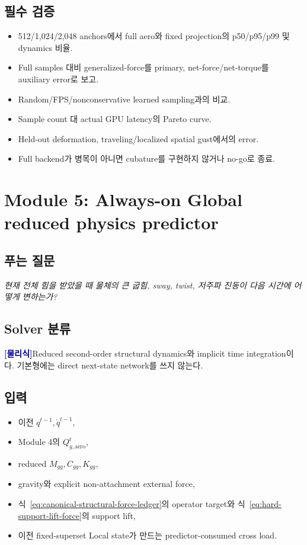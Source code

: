 \documentclass[11pt,a4paper]{article}
\newcommand{\physics}{\textcolor{darkblue}{\textbf{[물리식]}}}
\begin{document}
\subsection*{필수 검증}

\begin{itemize}[leftmargin=1.5em]
  \item 512/1,024/2,048 anchors에서 full aero와 fixed projection의 p50/p95/p99 및 dynamics 비율.
  \item Full samples 대비 generalized-force를 primary, net-force/net-torque를 auxiliary error로 보고.
  \item Random/FPS/nonconservative learned sampling과의 비교.
  \item Sample count 대 actual GPU latency의 Pareto curve.
  \item Held-out deformation, traveling/localized spatial gust에서의 error.
  \item Full backend가 병목이 아니면 cubature를 구현하지 않거나 no-go로 종료.
\end{itemize}

\section{Module 5: Always-on Global reduced physics predictor}

\subsection*{푸는 질문}

\emph{현재 전체 힘을 받았을 때 물체의 큰 굽힘, sway, twist, 저주파 진동이
다음 시간에 어떻게 변하는가?}

\subsection*{Solver 분류}

\physics Reduced second-order structural dynamics와 implicit time integration이다.
기본형에는 direct next-state network를 쓰지 않는다.

\subsection*{입력}

\begin{itemize}[leftmargin=1.5em]
  \item 이전 \(q^{t-1},\dot q^{t-1}\),
  \item Module 4의 \(Q_{g,\mathrm{aero}}^t\),
  \item reduced \(M_{gg},C_{gg},K_{gg}\),
  \item gravity와 explicit non-attachment external force,
  \item 식~\eqref{eq:canonical-structural-force-ledger}의 operator target와
  식~\eqref{eq:hard-support-lift-force}의 support lift,
  \item 이전 fixed-superset Local state가 만드는 predictor-consumed cross load.
\end{itemize}
\end{document}
